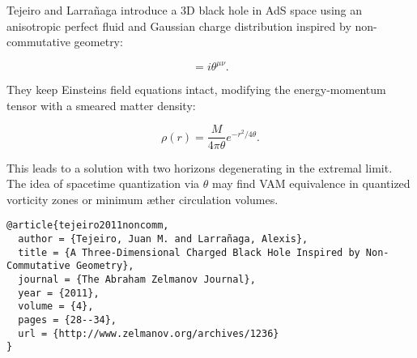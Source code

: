 Tejeiro and Larrañaga \cite{tejeiro2011noncomm} introduce a 3D black hole in AdS space using an anisotropic perfect fluid and Gaussian charge distribution inspired by non-commutative geometry:

\begin{equation}
[x^\mu, x^\nu] = i \theta^{\mu\nu}.
\end{equation}

They keep Einstein\rqs s field equations intact, modifying the energy-momentum tensor with a smeared matter density:

\begin{equation}
\rho(r) = \frac{M}{4\pi \theta} e^{-r^2/4\theta}.
\end{equation}

This leads to a solution with two horizons degenerating in the extremal limit. The idea of spacetime quantization via $\theta$ may find VAM equivalence in quantized vorticity zones or minimum æther circulation volumes.

\begin{verbatim}
@article{tejeiro2011noncomm,
  author = {Tejeiro, Juan M. and Larrañaga, Alexis},
  title = {A Three-Dimensional Charged Black Hole Inspired by Non-Commutative Geometry},
  journal = {The Abraham Zelmanov Journal},
  year = {2011},
  volume = {4},
  pages = {28--34},
  url = {http://www.zelmanov.org/archives/1236}
}
\end{verbatim}
